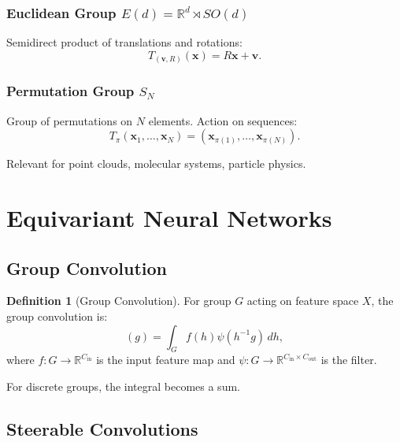 \documentclass[12pt]{report}
\theoremstyle{definition}
\newtheorem{definition}[theorem]{Definition}
\newcommand{\R}{\mathbb{R}}
\begin{document}
\subsubsection{Euclidean Group $E(d) = \R^d \rtimes SO(d)$}

Semidirect product of translations and rotations:
\begin{equation}
T_{(\mathbf{v}, R)}(\mathbf{x}) = R\mathbf{x} + \mathbf{v}.
\label{eq:euclidean_action}
\end{equation}

\subsubsection{Permutation Group $S_N$}

Group of permutations on $N$ elements. Action on sequences:
\begin{equation}
T_\pi(\mathbf{x}_1, \ldots, \mathbf{x}_N) = (\mathbf{x}_{\pi(1)}, \ldots, \mathbf{x}_{\pi(N)}).
\label{eq:permutation_action}
\end{equation}

Relevant for point clouds, molecular systems, particle physics.

\section{Equivariant Neural Networks}

\subsection{Group Convolution}

\begin{definition}[Group Convolution]
For group $G$ acting on feature space $X$, the group convolution is:
\begin{equation}
[f \star \psi](g) = \int_G f(h) \psi(h^{-1}g) \, dh,
\label{eq:group_conv}
\end{equation}
where $f: G \to \R^{C_{\text{in}}}$ is the input feature map and $\psi: G \to \R^{C_{\text{in}} \times C_{\text{out}}}$ is the filter.
\end{definition}

For discrete groups, the integral becomes a sum.

\subsection{Steerable Convolutions}
\end{document}
